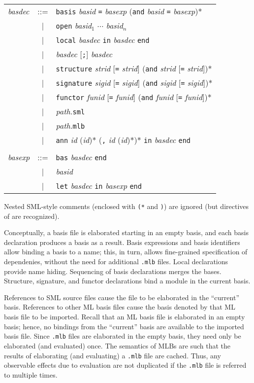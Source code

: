 \begin{htmlonly}
\begin{center}
\begin{tabular}{lcl}
{\it basdec} 
& ::=    & {\tt basis} {\it basid} {\tt =} {\it basexp}
            ({\tt and} {\it basid} {\tt =} {\it basexp})* \\
& | & {\tt open} {\it basid}$_1$ $\cdots$ {\it basid}$_n$ \\
& | & {\tt local} {\it basdec} {\tt in} {\it basdec} {\tt end} \\
& | & {\it basdec} [{\tt;}] {\it basdec} \\
& | & {\tt structure} {\it strid} [{\tt =} {\it strid}] 
                ({\tt and} {\it strid} [{\tt =} {\it strid}])* \\
& | & {\tt signature} {\it sigid} [{\tt =} {\it sigid}] 
                ({\tt and} {\it sigid} [{\tt =} {\it sigid}])* \\
& | &   {\tt functor} {\it funid} [{\tt =} {\it funid}] 
                ({\tt and} {\it funid} [{\tt =} {\it funid}])* \\
& | & {\it path.}{\tt sml} \\
& | & {\it path.}{\tt mlb} \\
& | & {\tt ann} {\it id} ({\it id})* ({\tt ,}  {\it id} ({\it id})*)*
           {\tt in} {\it basdec} {\tt end} \\
\\
{\it basexp}
& ::=    & {\tt bas} {\it basdec} {\tt end} \\
& | & {\it basid} \\
& | & {\tt let} {\it basdec} {\tt in} {\it basexp} {\tt end}
\end{tabular}
\end{center}
\end{htmlonly}

Nested SML-style comments (enclosed with {\tt (*} and {\tt *)}) are
ignored (but {\nline} directives of  are recognized).

Conceptually, a basis file is elaborated starting in an empty basis,
and each basis declaration produces a basis as a result.  Basis
expressions and basis identifiers allow binding a basis to a name;
this, in turn, allows fine-grained specification of dependenies,
without the need for additional {\tt .mlb} files.  Local declarations
provide name hiding.  Sequencing of basis declarations merges the
bases.  Structure, signature, and functor declarations bind a module
in the current basis.

References to SML source files cause the file to be elaborated in the
``current'' basis.  References to other ML basis files cause the basis
denoted by that ML basis file to be imported.  Recall that an ML basis
file is elaborated in an empty basis; hence, no bindings from the
``current'' basis are available to the imported basis file.  Since
{\tt .mlb} files are elaborated in the empty basis, they need only be
elaborated (and evaluated) once.  The semantics of MLBs are such that
the results of elaborating (and evaluating) a {\tt .mlb} file are
cached.  Thus, any observable effects due to evaluation are not
duplicated if the {\tt .mlb} file is referred to multiple times.

